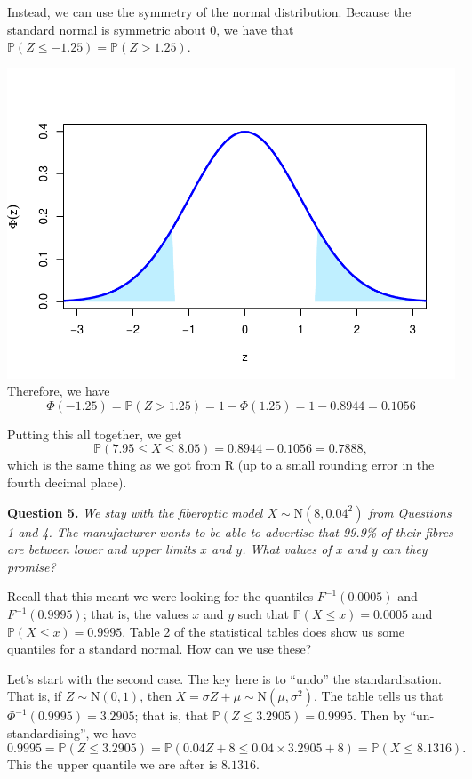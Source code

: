\documentclass[
  a4paper,
]{book}
\theoremstyle{definition}
\theoremstyle{definition}
\theoremstyle{definition}
\theoremstyle{definition}
\theoremstyle{remark}
\begin{document}
Instead, we can use the symmetry of the normal distribution. Because the standard normal is symmetric about 0, we have that \(\mathbb P(Z \leq -1.25) = \mathbb P(Z > 1.25)\).

\includegraphics{math1710_files/figure-latex/phiz-exm-1.pdf}
Therefore, we have
\[ \Phi(-1.25) = \mathbb P(Z > 1.25) = 1 - \Phi(1.25) = 1 - 0.8944 = 0.1056\]

Putting this all together, we get
\[\mathbb P(7.95 \leq X \leq 8.05) = 0.8944 - 0.1056 = 0.7888 , \]
which is the same thing as we got from R (up to a small rounding error in the fourth decimal place).

\textbf{Question 5.} \emph{We stay with the fiberoptic model \(X \sim \mathrm{N}(8, 0.04^2)\) from Questions 1 and 4. The manufacturer wants to be able to advertise that 99.9\% of their fibres are between lower and upper limits \(x\) and \(y\). What values of \(x\) and \(y\) can they promise?}

Recall that this meant we were looking for the quantiles \(F^{-1}(0.0005)\) and \(F^{-1}(0.9995)\); that is, the values \(x\) and \(y\) such that \(\mathbb P(X \leq x) = 0.0005\) and \(\mathbb P(X \leq x) = 0.9995\). Table 2 of the \href{https://mpaldridge.github.io/math1710/stat-tab.pdf}{statistical tables} does show us some quantiles for a standard normal. How can we use these?

Let's start with the second case. The key here is to ``undo'' the standardisation. That is, if \(Z \sim \mathrm{N}(0,1)\), then \(X = \sigma Z + \mu \sim \mathrm{N}(\mu, \sigma^2)\). The table tells us that \(\Phi^{-1}(0.9995) = 3.2905\); that is, that \(\mathbb P(Z \leq 3.2905) = 0.9995\). Then by ``un-standardising'', we have
\[ 0.9995 = \mathbb P(Z \leq 3.2905)  = \mathbb P(0.04Z + 8 \leq 0.04\times 3.2905 + 8) = \mathbb P(X \leq 8.1316) . \]
This the upper quantile we are after is \(8.1316\).
\end{document}
